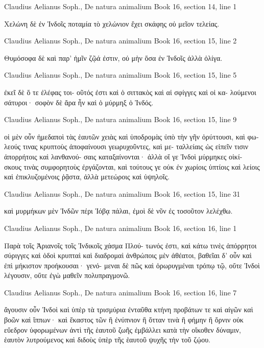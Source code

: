 \documentclass[12pt,letterpaper,twoside,final]{memoir}
\begin{document}
\begin{greek}
Claudius Aelianus Soph., De natura animalium 
Book 16, section 14, line 1


 Χελώνη δὲ ἐν Ἰνδοῖς ποταμία τὸ χελώνιον ἔχει 
σκάφης οὐ μεῖον τελείας. 



Claudius Aelianus Soph., De natura animalium 
Book 16, section 15, line 2

Θυμόσοφα δὲ καὶ παρ' ἡμῖν ζῷά ἐστιν, οὐ μὴν 
ὅσα ἐν Ἰνδοῖς ἀλλὰ ὀλίγα. 



Claudius Aelianus Soph., De natura animalium 
Book 16, section 15, line 5

                                    ἐκεῖ δὲ ὅ τε ἐλέφας τοι-
οῦτός ἐστι καὶ ὁ σιττακὸς καὶ αἱ σφίγγες καὶ οἱ κα-
λούμενοι σάτυροι· σοφὸν δὲ ἄρα ἦν καὶ ὁ μύρμηξ ὁ 
Ἰνδός. 



Claudius Aelianus Soph., De natura animalium 
Book 16, section 15, line 9

          οἱ μὲν οὖν ἡμεδαποὶ τὰς ἑαυτῶν χειὰς καὶ 
ὑποδρομὰς ὑπὸ τὴν γῆν ὀρύττουσι, καὶ φωλεούς 
τινας κρυπτοὺς ἀποφαίνουσι γεωρυχοῦντες, καὶ με-
ταλλείαις ὡς εἰπεῖν τισιν ἀπορρήτοις καὶ λανθανού-
σαις καταξαίνονται· ἀλλὰ οἵ γε Ἰνδοὶ μύρμηκες οἰκί-
σκους τινὰς συμφορητοὺς ἐργάζονται, καὶ τούτους γε 
οὐκ ἐν χωρίοις ὑπτίοις καὶ λείοις καὶ ἐπικλυζομένοις 
ῥᾷστα, ἀλλὰ μετεώροις καὶ ὑψηλοῖς. 



Claudius Aelianus Soph., De natura animalium 
Book 16, section 15, line 31

                           καὶ μυρμήκων μὲν Ἰνδῶν 
πέρι Ἰόβᾳ πάλαι, ἐμοὶ δὲ νῦν ἐς τοσοῦτον λελέχθω. 



Claudius Aelianus Soph., De natura animalium 
Book 16, section 16, line 1

Παρὰ τοῖς Ἀριανοῖς τοῖς Ἰνδικοῖς χάσμα Πλού-
τωνός ἐστι, καὶ κάτω τινὲς ἀπόρρητοι σύριγγες καὶ 
ὁδοὶ κρυπταὶ καὶ διαδρομαὶ ἀνθρώποις μὲν ἀθέατοι, 
βαθεῖαι δ' οὖν καὶ ἐπὶ μήκιστον προήκουσαι· γενό-
μεναι δὲ πῶς καὶ ὀρωρυγμέναι τρόπῳ τῷ, οὔτε Ἰνδοὶ 
λέγουσιν, οὔτε ἐγὼ μαθεῖν πολυπραγμονῶ. 



Claudius Aelianus Soph., De natura animalium 
Book 16, section 16, line 7

                                               ἄγουσιν 
οὖν Ἰνδοὶ καὶ ὑπὲρ τὰ τρισμύρια ἐνταῦθα κτήνη 
προβάτων τε καὶ αἰγῶν καὶ βοῶν καὶ ἵππων· καὶ 
ἕκαστος τῶν ἢ ἐνύπνιον ἢ ὄτταν τινὰ ἢ φήμην ἢ 
ὄρνιν οὐκ εὔεδρον ὑφορωμένων ἀντὶ τῆς ἑαυτοῦ 
ζωῆς ἐμβάλλει κατὰ τὴν οἴκοθεν δύναμιν, ἑαυτὸν 
λυτρούμενος καὶ διδοὺς ὑπὲρ τῆς ἑαυτοῦ ψυχῆς τὴν 
τοῦ ζῴου. 




\end{greek}
\end{document}
